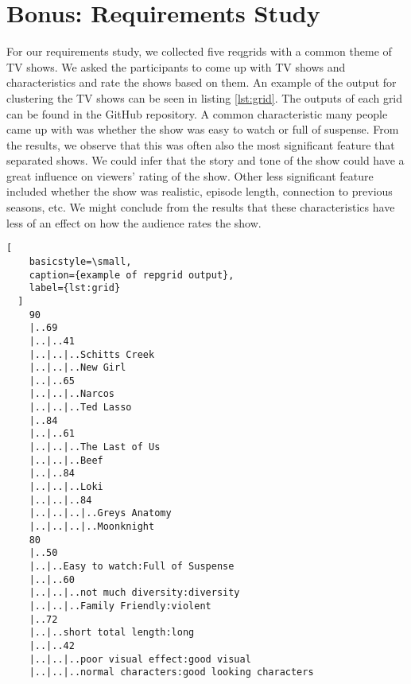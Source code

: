 \section{Bonus: Requirements Study}
\label{sec:bonus_requirements}

For our requirements study, we collected five reqgrids with a common
theme of TV shows. We asked the participants to come up with TV shows
and characteristics and rate the shows based on them. An example of the
output for clustering the TV shows can be seen in listing
\ref{lst:grid}. The outputs of each grid can be found in the GitHub
repository. A common characteristic
many people came up with was whether the show was easy to watch or full
of suspense. From the results, we observe that this was often also the
most significant feature that separated shows. We could infer that the
story and tone of the show could have a great influence on viewers'
rating of the show. Other less significant feature included whether the
show was realistic, episode length, connection to previous seasons, etc.
We might conclude from the results that these characteristics have less
of an effect on how the audience rates the show.

\begin{minipage}{\linewidth}
  \begin{lstlisting}[
    basicstyle=\small,
    caption={example of repgrid output},
    label={lst:grid}
  ]
    90
    |..69
    |..|..41
    |..|..|..Schitts Creek
    |..|..|..New Girl
    |..|..65
    |..|..|..Narcos
    |..|..|..Ted Lasso
    |..84
    |..|..61
    |..|..|..The Last of Us
    |..|..|..Beef
    |..|..84
    |..|..|..Loki
    |..|..|..84
    |..|..|..|..Greys Anatomy
    |..|..|..|..Moonknight
    80
    |..50
    |..|..Easy to watch:Full of Suspense
    |..|..60
    |..|..|..not much diversity:diversity
    |..|..|..Family Friendly:violent
    |..72
    |..|..short total length:long
    |..|..42
    |..|..|..poor visual effect:good visual
    |..|..|..normal characters:good looking characters
  \end{lstlisting}
\end{minipage}
